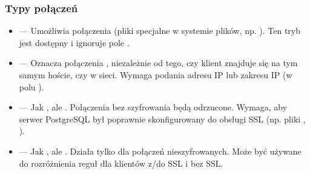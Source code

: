 \documentclass[a4paper,11pt,openany,english]{sphinxmanual}
\begin{document}
\subsubsection{Typy połączeń}
\label{\detokenize{rozdzial2/Bezpieczenstwo/index:typy-polaczen}}\begin{itemize}
\item {} 
\sphinxAtStartPar
{} — Umożliwia połączenia  (pliki specjalne w systemie plików, np. ).
Ten tryb jest dostępny  i ignoruje pole .

\item {} 
\sphinxAtStartPar
{} — Oznacza połączenia , niezależnie od tego, czy klient znajduje się na tym samym hoście, czy w sieci.
Wymaga podania adresu IP lub zakresu IP (w polu ).

\item {} 
\sphinxAtStartPar
{} — Jak , ale . Połączenia bez szyfrowania będą odrzucone.
Wymaga, aby serwer PostgreSQL był poprawnie skonfigurowany do obsługi SSL (np. pliki , ).

\item {} 
\sphinxAtStartPar
{} — Jak , ale . Działa tylko dla połączeń nieszyfrowanych.
Może być używane do rozróżnienia reguł dla klientów z/do SSL i bez SSL.

\end{itemize}
\end{document}

